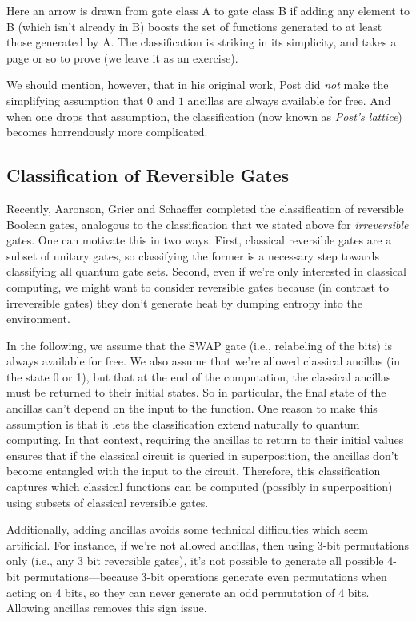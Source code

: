 \documentclass[11pt]{report}
\theoremstyle{plain}
\theoremstyle{definition}
\begin{document}
Here an arrow is drawn from gate class A to gate class B if adding any element to B (which isn't already in B) boosts the set of functions generated to at least those generated by A.  The classification is striking in its simplicity, and takes a page or so to prove (we leave it as an exercise).

We should mention, however, that in his original work, Post did {\em not} make the simplifying assumption that $0$ and $1$ ancillas are always available for free.  And when one drops that assumption, the classification (now known as {\em Post's lattice}) becomes horrendously more complicated.

\subsection{Classification of Reversible Gates} \label{REV}

Recently, Aaronson, Grier and Schaeffer \cite{ReversibleGates} completed the classification of reversible Boolean gates, analogous to the classification that we stated above for {\em irreversible} gates.  One can motivate this in two ways.  First, classical reversible gates are a subset of unitary gates, so classifying the former is a necessary step towards classifying all quantum gate sets. Second, even if we're only interested in classical computing, we might want to consider reversible gates because (in contrast to irreversible gates) they don't generate heat by dumping entropy into the environment.

In the following, we assume that the SWAP gate (i.e., relabeling of the bits) is always available for free.  We also assume that we're allowed classical ancillas (in the state 0 or 1), but that at the end of the computation, the classical ancillas must be returned to their initial states. So in particular, the final state of the ancillas can't depend on the input to the function. One reason to make this assumption is that it lets the classification extend naturally to quantum computing. In that context, requiring the ancillas to return to their initial values ensures that if the classical circuit is queried in superposition, the ancillas don't become entangled with the input to the circuit. Therefore, this classification captures which classical functions can be computed (possibly in superposition) using subsets of classical reversible gates.

Additionally, adding ancillas avoids some technical difficulties which seem artificial. For instance, if we're not allowed ancillas, then using 3-bit permutations only (i.e., any 3 bit reversible gates), it's not possible to generate all possible 4-bit permutations---because 3-bit operations generate even permutations when acting on 4 bits, so they can never generate an odd permutation of 4 bits. Allowing ancillas removes this sign issue.
\end{document}
